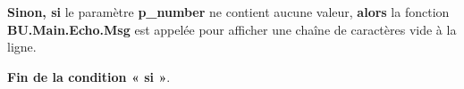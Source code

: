 \documentclass[a4paper,10pt]{article}
\begin{document}
    \begin{justify}
        \textbf{\color{cond}Sinon, si} le paramètre \textbf{\color{vars}p\_number} ne contient aucune valeur, \textbf{\color{cond}alors} la fonction \textbf{\color{func}BU.Main.Echo.Msg} est appelée pour afficher une chaîne de caractères vide à la ligne.
    \end{justify}

    \begin{justify}
        \textbf{\color{cond}Fin de la condition « si »}.
    \end{justify}
\end{document}
